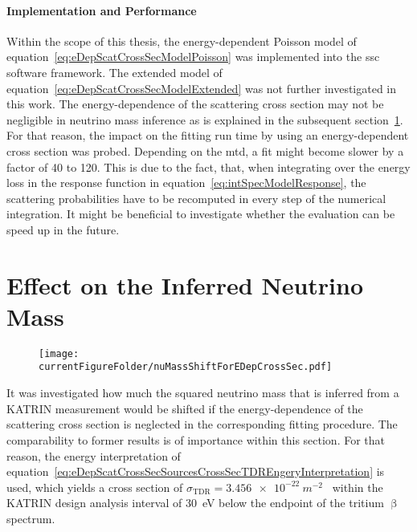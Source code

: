 \paragraph{Implementation and Performance}
Within the scope of this thesis, the energy-dependent Poisson model of equation~\eqref{eq:eDepScatCrossSecModelPoisson} was implemented into the \gls{ssc} software framework. The extended model of equation~\eqref{eq:eDepScatCrossSecModelExtended} was not further investigated in this work. The energy-dependence of the scattering cross section may not be negligible in neutrino mass inference as is explained in the subsequent section~\ref{sec:eDepScatCrossSecNuMassInf}. For that reason, the impact on the fitting run time by using an energy-dependent cross section was probed. Depending on the \gls{mtd}, a fit might become slower by a factor of 40 to 120. This is due to the fact, that, when integrating over the energy loss in the response function in equation~\eqref{eq:intSpecModelResponse}, the scattering probabilities have to be recomputed in every step of the numerical integration. It might be beneficial to investigate whether the evaluation can be speed up in the future.


\section{Effect on the Inferred Neutrino Mass}
\label{sec:eDepScatCrossSecNuMassInf}
\begin{figure}[t]
\texttt{[image: \\currentFigureFolder/nuMassShiftForEDepCrossSec.pdf]}
        \label{fig:eDepScatCrossSecNuMassInfShifts}
\end{figure}
It was investigated how much the squared neutrino mass that is inferred from a KATRIN measurement would be shifted if the energy-dependence of the scattering cross section is neglected in the corresponding fitting procedure. The comparability to former results is of importance within this section. For that reason, the energy interpretation of equation~\ref{eq:eDepScatCrossSecSourcesCrossSecTDREngeryInterpretation} is used, which yields a cross section of $\sigma_\mathrm{TDR}=\SI{3.456e-22}{m^{-2}}$~\cite{Angrik:2005ep} within the KATRIN design analysis interval of \SI{30}{eV} below the endpoint of the tritium $\upbeta$ spectrum.


